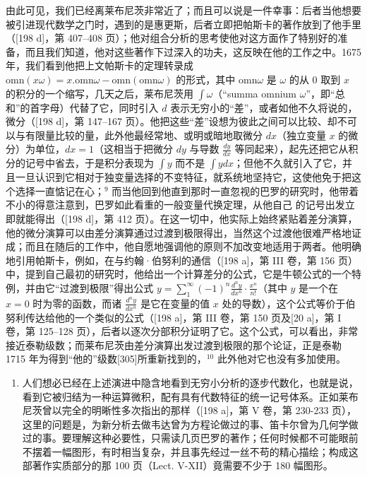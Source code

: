 由此可见，我们已经离莱布尼茨非常近了；而且可以说是一件幸事：后者当他想要被引进现代数学之门时，遇到的是惠更斯，后者立即把帕斯卡的著作放到了他手里（{[}198 d{]}，第 407–408 页）；他对组合分析的思考使他对这方面作了特别好的准备，而且我们知道，他对这些著作下过深入的功夫，这反映在他的工作之中。1675 年，我们看到他把上文帕斯卡的定理转录成 \(\mathrm{omn}(x\omega) = x . \mathrm{omn}\omega - \mathrm{omn}(\mathrm{omn}\omega)\) 的形式，其中 \(\mathrm{omn}\omega\) 是 \(\omega\) 的从 0 取到 \(x\) 的积分的一个缩写，几天之后，莱布尼茨用 \(\int \omega\)（“summa omnium \(\omega\)”，即“总和”的首字母）代替了它，同时引入 \(d\) 表示无穷小的“差”，或者如他不久将说的，微分（{[}198 d{]}，第 147–167 页）。他把这些“差”设想为彼此之间可以比较、却不可以与有限量比较的量，此外他最经常地、或明或暗地取微分 \(dx\)（独立变量 \(x\) 的微分）为单位，\(dx = 1\)（这相当于把微分 \(dy\) 与导数 \(\frac{dy}{dx}\) 等同起来），起先还把它从积分的记号中省去，于是积分表现为 \(\int y\) 而不是 \(\int ydx\)；但他不久就引入了它，并且一旦认识到它相对于独变量选择的不变特征，就系统地坚持它，这使他免于把这个选择一直惦记在心；\(^{9}\) 而当他回到他直到那时一直忽视的巴罗的研究时，他带着不小的得意注意到，巴罗如此看重的一般变量代换定理，从他自己 的记号出发立即就能得出（{[}198 d{]}，第 412 页）。在这一切中，他实际上始终紧贴着差分演算，他的微分演算可以由差分演算通过过渡到极限得出，当然这个过渡他很难严格地证成；而且在随后的工作中，他自愿地强调他的原则不加改变地适用于两者。他明确地引用帕斯卡，例如，在与约翰·伯努利的通信（{[}198 a{]}，第 III 卷，第 156 页）中，提到自己最初的研究时，他给出一个计算差分的公式，它是牛顿公式的一个特例，并由它“过渡到极限”得出公式 \(y = \sum_{1}^{\infty} (-1)^{n} \frac{d^{n}y}{dx^{n}} \cdot \frac{x^{n}}{n!}\)（其中 \(y\) 是一个在 \(x = 0\) 时为零的函数，而诸 \(\frac{d^{n}y}{dx^{n}}\) 是它在变量的值 \(x\) 处的导数），这个公式等价于伯努利传达给他的一个类似的公式（{[}198 a{]}，第 III 卷，第 150 页及{[}20 a{]}，第 I 卷，第 125–128 页），后者以逐次分部积分证明了它。这个公式，可以看出，非常接近泰勒级数；而莱布尼茨由差分演算出发过渡到极限的那个论证，正是泰勒 1715 年为得到“他的”级数{[}305{]}所重新找到的，\(^{10}\) 此外他对它也没有多加使用。

\begin{enumerate}
\def\labelenumi{\Alph{enumi})}
\setcounter{enumi}{5}
\tightlist
\item
  人们想必已经在上述演进中隐含地看到无穷小分析的逐步代数化，也就是说，看到它被归结为一种运算微积，配有具有代数特征的统一记号体系。正如莱布尼茨曾以完全的明晰性多次指出的那样（{[}198 a{]}，第 V 卷，第 230-233 页），这里的问题是，为新分析去做韦达曾为方程论做过的事、笛卡尔曾为几何学做过的事。要理解这种必要性，只需读几页巴罗的著作；任何时候都不可能眼前不摆着一幅图形，有时相当复杂，并且事先经过一丝不苟的精心描绘；构成这部著作实质部分的那 100 页（Lect. V-XII）竟需要不少于 180 幅图形。
\end{enumerate}

